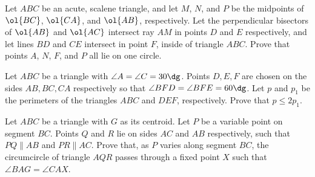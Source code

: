 
\begin{probEG}[USAMO 2008/2]
  Let $ABC$ be an acute, scalene triangle, and let $M$, $N$, and $P$ be the
  midpoints of $\ol{BC}$, $\ol{CA}$, and $\ol{AB}$, respectively. Let the
  perpendicular bisectors of $\ol{AB}$ and $\ol{AC}$ intersect ray $AM$ in
  points $D$ and $E$ respectively, and let lines $BD$ and $CE$ intersect in
  point $F$, inside of triangle $ABC$. Prove that points $A$, $N$, $F$, and $P$
  all lie on one circle.
\end{probEG}


\begin{probMG}
  Let $ABC$ be a triangle with $\angle A=\angle C=30\dg$. Points $D,E,F$ are
  chosen on the sides $AB,BC,CA$ respectively so that
  $\angle BFD=\angle BFE=60\dg$. Let $p$ and $p_1$ be the perimeters of the
  triangles $ABC$ and $DEF$, respectively. Prove that $p\le 2p_1$.
\end{probMG}

\begin{probEG}
  Let $ABC$ be a triangle with $G$ as its centroid. Let $P$ be a variable point
  on segment $BC$. Points $Q$ and $R$ lie on sides $AC$ and $AB$ respectively,
  such that $PQ\parallel AB$ and $PR\parallel AC$. Prove that, as $P$ varies
  along segment $BC$, the circumcircle of triangle $AQR$ passes through a fixed
  point $X$ such that $\angle BAG=\angle CAX$.
\end{probEG}

